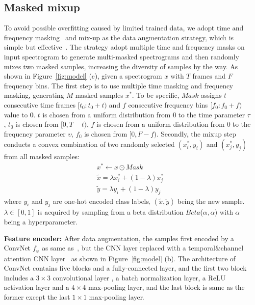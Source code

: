 \documentclass[a4paper]{article}
\begin{document}
\subsection{Masked mixup}
\vspace{-1.5mm}
To avoid possible overfitting caused by limited trained data, we adopt time and frequency masking~\cite{timefrequnencymask} and mix-up as the data augmentation strategy, which is simple but effective~\cite{dataa}. The strategy adopt multiple time and frequency masks on input spectrogram to generate multi-masked spectrograms and then randomly mixes two masked samples, increasing the diversity of samples by the way.
As shown in Figure~\ref{fig:model} (c), given a spectrogram $x$ with $T$ frames and $F$ frequency bins. The first step is to use multiple time masking and frequency masking, generating $M$ masked samples $x^{*}$.
To be specific, $Mask$ assigns $t$ consecutive time frames $[t_0:t_0+t)$ and $f$ consecutive frequency bins $[f_0:f_0+f)$ value to 0. $t$ is chosen from a uniform distribution from 0 to the time parameter $\tau$, $t_0$ is chosen from $[0,T-t)$, $f$ is chosen from a uniform distribution from 0 to the frequency parameter $\upsilon$, $f_0$ is chosen from $[0, F-f)$.
Secondly, the mixup step conducts a convex combination of two randomly selected $(x_i^{*}, y_i)$ and $(x_j^{*}, y_j)$ from all masked samples:
\begin{align}
&x^{*} \leftarrow x \odot Mask \\
&\tilde{x} = \lambda x_i^{*} + (1 - \lambda)x_j^{*} \\
&\tilde{y} = \lambda y_i + (1 - \lambda)y_j 
\end{align}
where $y_i$ and $y_j$ are one-hot encoded class labels, $(\tilde{x}, \tilde{y})$ being the new sample. $\lambda \in [0,1]$ is acquired by sampling from a beta distribution $Beta$($\alpha, \alpha$) with $\alpha$ being a hyperparameter.

\vspace{1mm}
\noindent\textbf{Feature encoder:} After data augmentation, the samples first encoded by a ConvNet $f_{\varphi}$ as same as~\cite{attentionSimilarity}, but the CNN layer replaced with a temporal\&channel attention CNN layer~\cite{timefrequnencymask} as shown in Figure~\ref{fig:model} (b). The architecture of ConvNet contains five blocks and a fully-connected layer, and the first two block includes a $3 \times 3$ convolutional  layer , a batch normalization layer, a ReLU activation layer and a $4 \times 4$ max-pooling layer, and the last block is same as the former except the last $1\times1$ max-pooling layer. 
\end{document}
